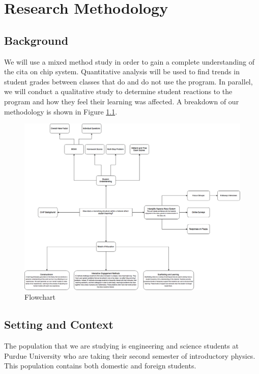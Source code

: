 \chapter[Chapter 3: Research Methodology]{Research Methodology}

\section{Background}

We will use a mixed method study in order to gain a complete understanding of the \gls{cita} on \gls{chip} system. Quantitative analysis will be used to find trends in student grades between classes that do and do not use the program. In parallel, we will conduct a qualitative study to determine student reactions to the program and how they feel their learning was affected. A breakdown of our methodology is shown in Figure \ref{fig:flowchart}.

\begin{figure}[!htb]
	\centering
	\includegraphics[width=6in]{img/chapter3/flowchart}
	\caption[Flowchart]{Flowchart}
  \label{fig:flowchart}
\end{figure}

\section{Setting and Context}

The population that we are studying is engineering and science students at Purdue University who are taking their second semester of introductory physics. This population contains both domestic and foreign students.

